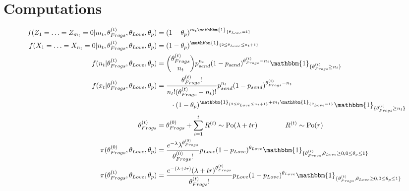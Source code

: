 \documentclass[10pt, a4paper]{article}
\begin{document}
    \section{Computations}
    \begin{align*}
        f(Z_1 = \ldots = Z_{m_t} = 0|m_t, \theta_{Frogs}^{(t)}, \theta_{Love}, \theta_p)
        &= (1-\theta_p)^{m_t\mathbbm{1}_{\{\theta_{Love} = 1\}}} \\
        f(X_1 = \ldots = X_{n_t} = 0|n_t, \theta_{Frogs}^{(t)}, \theta_{Love}, \theta_p)
        &= (1-\theta_p)^{\mathbbm{1}_{\{2\leq\theta_{Love}\leq n_t+1\}}} \\
        f(n_t|\theta_{Frogs}^{(t)}, \theta_{Love}, \theta_p) 
        &= \binom{\theta_{Frogs}^{(t)}}{n_t}p_{send}^{n_t}(1-p_{send})^{\theta_{Frogs}^{(t)}-n_t} \mathbbm{1}_{\{\theta_{Frogs}^{(t)}\geq n_t\}} \\
        f(x_t|\theta_{Frogs}^{(t)}, \theta_{Love}, \theta_p)
        &= \frac{\theta_{Frogs}^{(t)}!}{n_t!(\theta_{Frogs}^{(t)}-n_t)!}p_{send}^{n_t}(1-p_{send})^{\theta_{Frogs}^{(t)}-n_t} \\&\qquad\cdot (1-\theta_p)^{\mathbbm{1}_{\{2\leq\theta_{Love}\leq n_t+1\}} + m_t\mathbbm{1}_{\{\theta_{Love} = 1\}}} \mathbbm{1}_{\{\theta_{Frogs}^{(t)}\geq n_t\}} \\
        \theta_{Frogs}^{(t)} 
        &= \theta_{Frogs}^{(0)} + \sum_{i=1}^{t} R^{(t)} \sim \mathrm{Po}(\lambda+tr) \qquad\qquad R^{(t)} \sim \mathrm{Po}(r) \\
        \pi(\theta_{Frogs}^{(0)}, \theta_{Love}, \theta_p)
        &= \frac{e^{-\lambda}\lambda^{\theta_{Frogs}^{(0)}}}{\theta_{Frogs}^{(0)}!}p_{Love}(1-p_{Love})^{\theta_{Love}} \mathbbm{1}_{\{\theta_{Frogs}^{(t)}, \theta_{Love}\geq 0, 0 \leq \theta_p \leq 1\}} \\
        \pi(\theta_{Frogs}^{(t)}, \theta_{Love}, \theta_p)
        &= \frac{e^{-(\lambda+tr)}(\lambda+tr)^{\theta_{Frogs}^{(t)}}}{\theta_{Frogs}^{(t)}!}p_{Love}(1-p_{Love})^{\theta_{Love}} \mathbbm{1}_{\{\theta_{Frogs}^{(t)}, \theta_{Love}\geq 0, 0 \leq \theta_p \leq 1\}}
    \end{align*}
\end{document}
